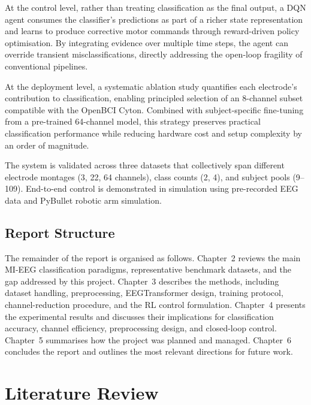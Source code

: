 \documentclass[12pt, a4paper]{article}
\begin{document}
At the control level, rather than treating classification as the final output, a DQN agent consumes the classifier's predictions as part of a richer state representation and learns to produce corrective motor commands through reward-driven policy optimisation. By integrating evidence over multiple time steps, the agent can override transient misclassifications, directly addressing the open-loop fragility of conventional pipelines.

At the deployment level, a systematic ablation study quantifies each electrode's contribution to classification, enabling principled selection of an 8-channel subset compatible with the OpenBCI Cyton. Combined with subject-specific fine-tuning from a pre-trained 64-channel model, this strategy preserves practical classification performance while reducing hardware cost and setup complexity by an order of magnitude.

The system is validated across three datasets that collectively span different electrode montages (3, 22, 64 channels), class counts (2, 4), and subject pools (9--109). End-to-end control is demonstrated in simulation using pre-recorded EEG data and PyBullet robotic arm simulation.

\subsection{Report Structure}

The remainder of the report is organised as follows. Chapter~2 reviews the main MI-EEG classification paradigms, representative benchmark datasets, and the gap addressed by this project. Chapter~3 describes the methods, including dataset handling, preprocessing, EEGTransformer design, training protocol, channel-reduction procedure, and the RL control formulation. Chapter~4 presents the experimental results and discusses their implications for classification accuracy, channel efficiency, preprocessing design, and closed-loop control. Chapter~5 summarises how the project was planned and managed. Chapter~6 concludes the report and outlines the most relevant directions for future work.

\section{Literature Review}
\end{document}
